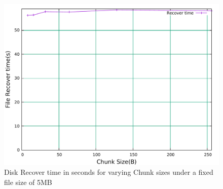 \begin{figure}[h]
\includegraphics[width=\linewidth]{figures/RAIDRecoverTimeChuckSize5Mb.pdf}
\centering
\caption{Disk Recover time in seconds for varying Chunk sizes under a fixed file size of 5MB}
\label{fig:S3R6RcvCHK5MB}
\end{figure}
